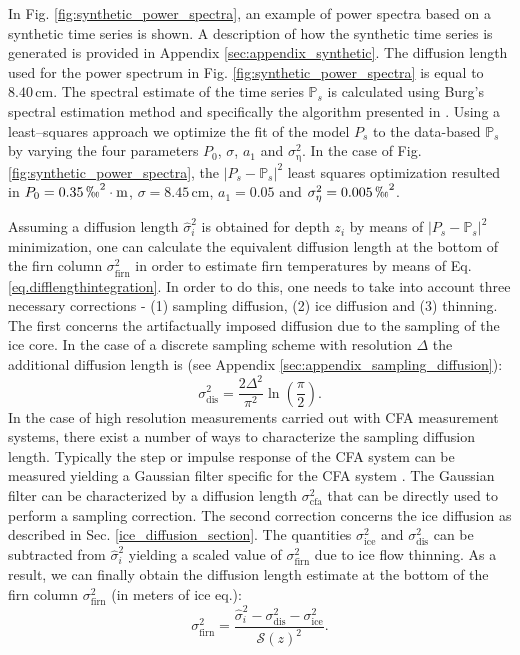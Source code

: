 \documentclass[11pt, draftcls, onecolumn]{IEEEtran} %
\numberwithin{equation}{section}
\numberwithin{table}{section}
\numberwithin{figure}{section}
\begin{document}
In Fig. \ref{fig:synthetic_power_spectra}, an example of power spectra based on a synthetic time series is shown. 
A description of how the synthetic time series is generated is provided in Appendix \ref{sec:appendix_synthetic}.
The diffusion length used for the power spectrum in Fig. \ref{fig:synthetic_power_spectra} is equal to $8.40 \, \mathrm{cm}$.
The spectral estimate of the time series $\mathbb{P}_s$ 
is calculated using Burg's spectral estimation method
\citep{Kay1981} and specifically the algorithm presented in \cite{Andersen1974}. 
Using a least--squares approach we optimize the fit of the model $P_s$ to the data-based $\mathbb{P}_s$ by varying the four 
parameters $P_0$, $\sigma$, $a_1$ and $\sigma_{\mathrm{\eta}}^2$.
In the case of Fig. \ref{fig:synthetic_power_spectra},
the $\vert P_s - \mathbb{P}_s \vert^2$ least squares optimization resulted in 
$P_0=0.35\,\permil^2\cdot \mathrm{m}$, $\sigma = 8.45 \, \mathrm{cm}$, $a_1 = 0.05$ and $\sigma_{\mathrm{\eta}}^2 =0.005 \, \permil^2$.


Assuming a diffusion length $\widehat{\sigma}_i^2$ is obtained for depth $z_i$ by means of 
$\vert P_s - \mathbb{P}_s \vert^2$ minimization, one can calculate the equivalent diffusion 
length at the bottom of the firn column $\sigma^2_{\mathrm{firn}}$ in order to estimate firn temperatures
by means of Eq. \ref{eq.difflengthintegration}. 
In order to do this, one needs to take into account three necessary corrections
- (1) sampling diffusion, (2) ice diffusion and (3) thinning. 
The first concerns the artifactually imposed
diffusion due to the sampling of the ice core. 
In the case of a discrete sampling scheme with resolution $\Delta$ the additional 
diffusion length is (see Appendix \ref{sec:appendix_sampling_diffusion}): 
\begin{equation}
\sigma^2_{\mathrm{dis}} = \frac{2\Delta^2}{\pi^2}\ln{\left(\frac{\pi}{2}\right)}.
\label{sampling_sigma}
\end{equation}
In the case of high resolution measurements carried out with CFA measurement systems, there
exist a number of ways to characterize the sampling diffusion length. 
Typically the step or impulse response of the CFA system can be measured yielding a Gaussian 
filter specific for the CFA system \citep{Gkinis2011, Emanuelsson2015, Jones2017a}. 
The Gaussian filter can be characterized by a diffusion 
length $\sigma^2_{\mathrm{cfa}}$ that can be directly used to perform a sampling correction.
The second correction concerns the ice diffusion as described in Sec. \ref{ice_diffusion_section}.
The quantities $\sigma^2_{\mathrm{ice}}$ and $\sigma^2_{\mathrm{dis}}$ can be subtracted from 
$\widehat{\sigma}_i^2$ yielding a scaled value   of $\sigma^2_{\mathrm{firn}}$ due to ice flow thinning.
As a result,  we can finally obtain the diffusion length estimate at the bottom of the firn column $\sigma^2_{\mathrm{firn}}$ (in meters of ice eq.):
\begin{equation} 
\sigma^2_\text{firn} = \frac{\widehat{\sigma}_i^2 - \sigma^2_\text{dis} - \sigma^2_\text{ice}}{{\mathcal{S}(z)}^{2}}.
\label{eq.firn_data}
\end{equation}
\end{document}
